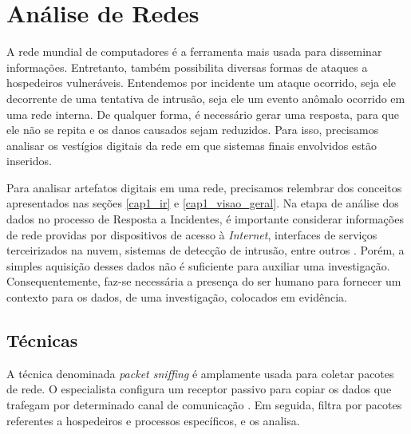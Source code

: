 \section{Análise de Redes}
    
    \vspace{10.5cm}
    
    \hspace{1cm}
    A rede mundial de computadores é a ferramenta mais usada para disseminar informações. Entretanto, também possibilita diversas formas de ataques a hospedeiros vulneráveis. Entendemos por incidente um ataque ocorrido, seja ele decorrente de uma tentativa de intrusão, seja ele um evento anômalo ocorrido em uma rede interna. De qualquer forma, é necessário gerar uma resposta, para que ele não se repita e os danos causados sejam reduzidos. Para isso, precisamos analisar os vestígios digitais da rede em que sistemas finais envolvidos estão inseridos.
    
    \vspace{4mm}
    
    \hspace{1cm}
    Para analisar artefatos digitais em uma rede, precisamos relembrar dos conceitos apresentados nas seções \ref{cap1_ir} e \ref{cap1_visao_geral}. Na etapa de análise dos dados no processo de Resposta a Incidentes, é importante considerar informações de rede providas por dispositivos de acesso à \textit{Internet}, interfaces de serviços terceirizados na nuvem, sistemas de detecção de intrusão, entre outros \cite{luttgens2014}. Porém, a simples aquisição desses dados não é suficiente para auxiliar uma investigação. Consequentemente, faz-se necessária a presença do ser humano para fornecer um contexto para os dados, de uma investigação, colocados em evidência.
    
    \subsection{Técnicas}
    
    \hspace{1cm}
    A técnica denominada \textit{packet sniffing} é amplamente usada para coletar pacotes de rede. O especialista configura um receptor passivo para copiar os dados que trafegam por determinado canal de comunicação \cite{kurose2013}. Em seguida, filtra por pacotes referentes a hospedeiros e processos específicos, e os analisa.
    
    \vspace{4mm}
    
